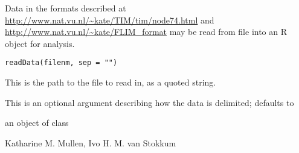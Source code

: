 \begin{Description}\relax
Data in the formats described at 
\url{http://www.nat.vu.nl/~kate/TIM/tim/node74.html} and 
\url{http://www.nat.vu.nl/~kate/FLIM_format}
may be read from file into an R object for analysis.
\end{Description}
\begin{Usage}
\begin{verbatim}
readData(filenm, sep = "")
\end{verbatim}
\end{Usage}
\begin{Arguments}
\begin{ldescription}
\item[\code{filenm}] This is the path to the file to read in, as a quoted
string. 
\item[\code{sep}] This is an optional argument describing how the data is 
delimited; defaults to 
\end{ldescription}
\end{Arguments}
\begin{Value}
an object of class 
\end{Value}
\begin{Author}\relax
Katharine M. Mullen, Ivo H. M. van Stokkum
\end{Author}
\begin{SeeAlso}\relax
{}
\end{SeeAlso}

